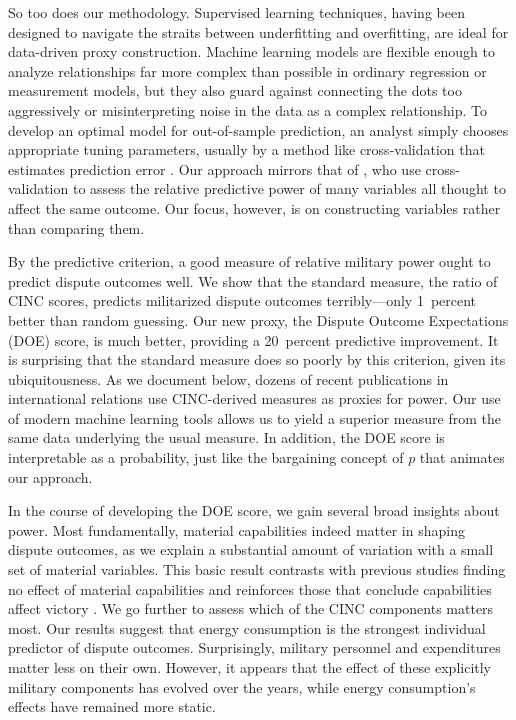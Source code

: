 So too does our methodology.
Supervised learning techniques, having been designed to navigate the straits between underfitting and overfitting, are ideal for data-driven proxy construction.
Machine learning models are flexible enough to analyze relationships far more complex than possible in ordinary regression or measurement models, but they also guard against connecting the dots too aggressively or misinterpreting noise in the data as a complex relationship.
To develop an optimal model for out-of-sample prediction, an analyst simply chooses appropriate tuning parameters, usually by a method like cross-validation that estimates prediction error \citep{Efron:2012es}.
Our approach mirrors that of \citet{Hill:2014ki}, who use cross-validation to assess the relative predictive power of many variables all thought to affect the same outcome.
Our focus, however, is on constructing variables rather than comparing them.

By the predictive criterion, a good measure of relative military power ought to predict dispute outcomes well.
We show that the standard measure, the ratio of CINC scores, predicts militarized dispute outcomes terribly---only 1~percent better than random guessing.
Our new proxy, the Dispute Outcome Expectations (DOE) score, is much better, providing a 20~percent predictive improvement.
It is surprising that the standard measure does so poorly by this criterion, given its ubiquitousness.
As we document below, dozens of recent publications in international relations use CINC-derived measures as proxies for power.
Our use of modern machine learning tools allows us to yield a superior measure from the same data underlying the usual measure.
In addition, the DOE score is interpretable as a probability, just like the bargaining concept of $p$ that animates our approach.

In the course of developing the DOE score, we gain several broad insights about power.
Most fundamentally, material capabilities indeed matter in shaping dispute outcomes, as we explain a substantial amount of variation with a small set of material variables.
This basic result contrasts with previous studies finding no effect of material capabilities \citep{Cannizzo:1980vz,Maoz:1983cw} and reinforces those that conclude capabilities affect victory \citep{wartrap,Stam:1996wl,Sullivan:2012vi}.
We go further to assess which of the CINC components matters most.
Our results suggest that energy consumption is the strongest individual predictor of dispute outcomes.
Surprisingly, military personnel and expenditures matter less on their own.
However, it appears that the effect of these explicitly military components has evolved over the years, while energy consumption's effects have remained more static.

